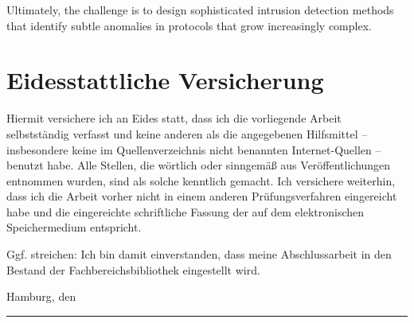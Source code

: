\documentclass[
    fontsize=12pt,
    headings=small,
    parskip=half,           %
    bibliography=totoc,
    numbers=noenddot,       %
    open=any,               %
    ]{scrreprt}
\begin{document}
Ultimately, the challenge is to design sophisticated intrusion detection methods that identify subtle anomalies in protocols that grow increasingly complex.


\begin{raggedright}         %
  \printbibliography        %
  \label{sec:literaturverzeichnis}
\end{raggedright}


\appendix
\setcounter{figure}{0}
\renewcommand\thetable{A.\arabic{figure}}
\setcounter{table}{0}
\renewcommand\thetable{A.\arabic{table}}
\newpage
		
\chapter*{Eidesstattliche Versicherung} %
\vspace{1cm}

%
Hiermit versichere ich an Eides statt, dass ich die vorliegende Arbeit
selbstständig verfasst und keine anderen als die angegebenen Hilfsmittel –
insbesondere keine im Quellenverzeichnis nicht benannten Internet-Quellen –
benutzt habe. Alle Stellen, die wörtlich oder sinngemäß aus Veröffentlichungen
entnommen wurden, sind als solche kenntlich gemacht. Ich versichere weiterhin,
dass ich die Arbeit vorher nicht in einem anderen Prüfungsverfahren eingereicht
habe und die eingereichte schriftliche Fassung der auf dem elektronischen
Speichermedium entspricht.

Ggf. streichen: Ich bin damit einverstanden, dass meine Abschlussarbeit in den
Bestand der Fachbereichsbibliothek eingestellt wird.

\makeatletter
Hamburg, den {\@date}
\makeatother

\vspace{2cm}
\rule{6cm}{0.25pt}\\
\makeatletter
{\@author} \par
\makeatother





\listoftodos
\end{document}

